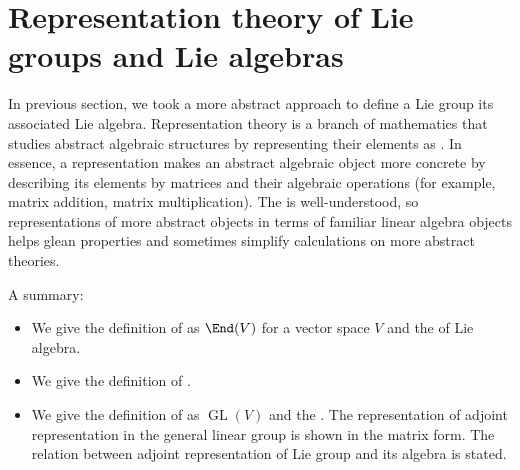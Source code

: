 \documentclass{article}
\newcommand{\GL}{\operatorname{GL}}
\begin{document}
\section{Representation theory of Lie groups and Lie algebras}\label{sec:lie_rep}
In previous section, we took a more abstract approach to define a Lie group its associated Lie algebra. {\tiny Representation theory is a branch of mathematics that studies abstract algebraic structures by representing their elements as . In essence, a representation makes an abstract algebraic object more concrete by describing its elements by matrices and their algebraic operations (for example, matrix addition, matrix multiplication). The  is well-understood, so representations of more abstract objects in terms of familiar linear algebra objects helps glean properties and sometimes simplify calculations on more abstract theories.} 

A summary:
\begin{itemize}[$\blacktriangleright$]
\item We give the definition of  as $\End(V)$ for a vector space $V$ and the  of Lie algebra.
\item We give the definition of .

\item We give the definition of  as $\GL(V)$ and the . The representation of adjoint representation in the general linear group is shown in the matrix form.  The relation between adjoint representation of Lie group and its algebra is stated. 

\end{itemize}
\end{document}
